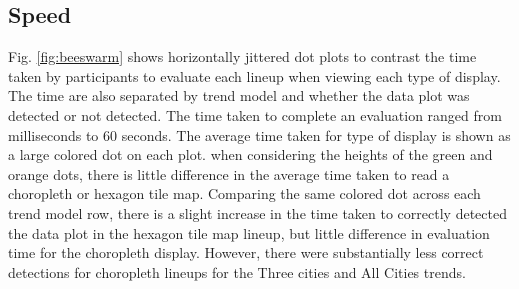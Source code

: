 \documentclass[conference,final,]{IEEEtran}
\begin{document}
\hypertarget{speed}{%
\subsection{Speed}\label{speed}}

Fig. \ref{fig:beeswarm} shows horizontally jittered dot plots to contrast the time taken by participants to evaluate each lineup when viewing each type of display. The time are also separated by trend model and whether the data plot was detected or not detected. The time taken to complete an evaluation ranged from milliseconds to 60 seconds. The average time taken for type of display is shown as a large colored dot on each plot. when considering the heights of the green and orange dots, there is little difference in the average time taken to read a choropleth or hexagon tile map. Comparing the same colored dot across each trend model row, there is a slight increase in the time taken to correctly detected the data plot in the hexagon tile map lineup, but little difference in evaluation time for the choropleth display. However, there were substantially less correct detections for choropleth lineups for the Three cities and All Cities trends.
\end{document}
